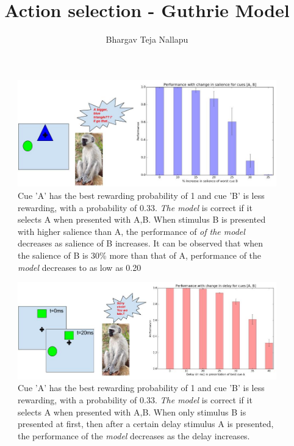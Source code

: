 \documentclass[12pt]{article}
\title{\textbf{Action selection - Guthrie Model}}
\author{Bhargav Teja Nallapu}
\begin{document}
\begin{figure}[ht]
  \centering
  \includegraphics[width=\textwidth]{MonkeyTask_21.jpg}
  \caption[Varying performance under external factors]{Cue 'A' has the best rewarding probability of 1 and cue 'B' is less rewarding, with a probability of 0.33. \emph{The model} is correct if it selects A when presented with A,B. When stimulus B is presented with higher salience than A, the performance of \emph{of the model} decreases as salience of B increases. It can be observed that when the salience of B is 30\% more than that of A, performance of the \emph{model} decreases to as low as 0.20}
\end{figure}

\clearpage

\begin{figure}[ht]
  \centering
  \includegraphics[width=\textwidth]{MonkeyTask_31.jpg}
  \caption[Varying performance under external factors]{Cue 'A' has the best rewarding probability of 1 and cue 'B' is less rewarding, with a probability of 0.33. \emph{The model} is correct if it selects A when presented with A,B. When only stimulus B is presented at first, then after a certain delay stimulus A is presented, the performance of the \emph{model} decreases as the delay increases.}
\end{figure}

\nocite{*}
{}

\end{document}

